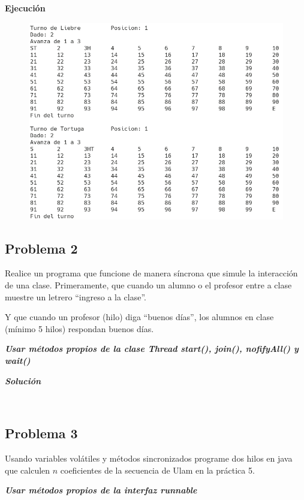 \documentclass[11pt, twocolumn]{article}
\begin{document}
  \newpage
  \textbf{Ejecución}
  \begin{figure}[h!]
    \centering
    \includegraphics[width=\columnwidth]{12P1.png}
  \end{figure}

  \subsection*{Problema 2}
  Realice un programa que funcione de manera síncrona que simule la interacción de una clase. Primeramente, que cuando un alumno o el profesor entre a clase muestre un letrero ``ingreso a la clase''.

  Y que cuando un profesor (hilo) diga “buenos días”, los alumnos en clase (mínimo 5 hilos) respondan buenos días.

  \textit{\textbf{Usar métodos propios de la clase Thread start(), join(), nofifyAll() y wait()}}

  \textit{\textbf{Solución}}
  \begin{lstlisting}
    
  \end{lstlisting}

  \subsection*{Problema 3}
  Usando variables volátiles y métodos sincronizados programe dos hilos en java que calculen $n$ coeficientes de la secuencia de Ulam en la práctica 5. 

  \textit{\textbf{Usar métodos propios de la interfaz runnable}}
\end{document}

